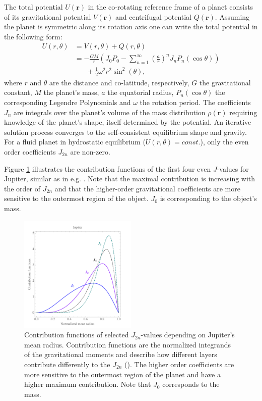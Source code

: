 \documentclass[usenatbib]{mnras}
\newcommand{\Vector}[1]{\mathbf{#1}}
\begin{document}
The total potential $U(\Vector{r})$ in the co-rotating reference frame of a planet consists of its gravitational potential $V(\Vector{r})$ and centrifugal potential $Q(\Vector{r})$. Assuming the planet is symmetric along its rotation axis one can write the total potential in the following form:
\begin{align*}
    U(r, \theta) &= V(r, \theta) + Q(r, \theta) \\
    &= -\frac{GM}{r} \left(J_0P_0-\sum_{n=1}^{\infty}\left( \frac{a}{r}\right)^n J_n P_n(\cos\theta)\right) \\
    &\quad\text{ }+ \frac{1}{2}\omega^2r^2\sin^2(\theta),
\end{align*}
where $r$ and  $\theta$ are the distance and co-latitude, respectively, $G$ the gravitational constant, $M$ the planet's mass, $a$ the equatorial radius, $P_n(\cos\theta)$ the corresponding Legendre Polynomials and $\omega$ the rotation period. The coefficients $J_n$ are integrals over the planet's volume of the mass distribution $\rho(\Vector{r})$ requiring knowledge of the planet's shape, itself determined by the potential. An iterative solution process converges to the self-consistent equilibrium shape and gravity. For a fluid planet in hydrostatic equilibrium ($U(r, \theta) = const.$), only the even order coefficients $J_{2n}$ are non-zero. 

Figure \ref{fig:contr_function} illustrates the contribution functions of the first four even $J$-values for Jupiter, similar as in e.g. \citet{2011Helled}.
Note that the maximal contribution is increasing with the order of $J_{2n}$ and that the higher-order gravitational coefficients are more sensitive to the outermost region of the object. $J_0$ is corresponding to the object's mass.
\begin{figure}
    \centering
    \includegraphics[width = 0.5\textwidth]{Figures/CF_4Benno.pdf}
    \caption{Contribution functions of selected $J_{2n}$-values depending on Jupiter's mean radius. Contribution functions are the normalized integrands of the gravitational moments and describe how different layers contribute differently to the $J_{2n}$ (\cite{ZHARKOV1974, Guillot2009}). The higher order coefficients are more sensitive to the outermost region of the planet and have a higher maximum contribution. Note that $J_0$ corresponds to the mass.}
    \label{fig:contr_function}
\end{figure}
\end{document}
